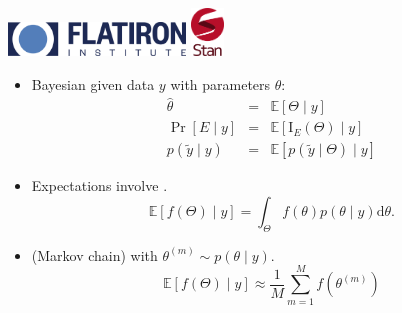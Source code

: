 \documentclass[10pt]{report}
\begin{document}
\sf%
\vspace*{-12pt}
%
\noindent
\spc{\Huge\bfseries \color{MidnightBlue}{WALNUTS:}}
\\[12pt]
\spc{\LARGE\bfseries \color{MidnightBlue}{Per-leapfrog step size
    adaptation for HMC}}
\\[16pt]
\noindent
\spc{\Large\bfseries \color{MidnightBlue}{Bob Carpenter}}
\\[8pt]
\\[4pt]
\\[12pt]
\vfill
\hfill
\includegraphics[height=0.35in]{img/fi-logo.png}
\qquad
\includegraphics[height=0.5in]{img/stan-logo.png}

\begin{itemize}
\item Bayesian  given data $y$ with parameters $\theta$:
\begin{eqnarray*}
  \widehat{\theta} & = & \mathbb{E}[\Theta \mid y]
  \\
  \Pr[E \mid y] & = & \mathbb{E}[\textrm{I}_E(\Theta) \mid y]
  \\
  p(\widetilde{y} \mid y) & = & \mathbb{E}[p(\widetilde{y} \mid
                                \Theta) \mid y]
\end{eqnarray*}
\item Expectations involve .
  $$ \mathbb{E}[f(\Theta) \mid y] = \int_\Theta f(\theta) p(\theta
  \mid y) \textrm{d}\theta. $$
\item (Markov chain)  with $\theta^{(m)} \sim p(\theta \mid y).$
  $$ \mathbb{E}[f(\Theta) \mid y] \approx \frac{1}{M} \sum_{m=1}^M
  f(\theta^{(m)}) $$
\end{itemize}
\end{document}
